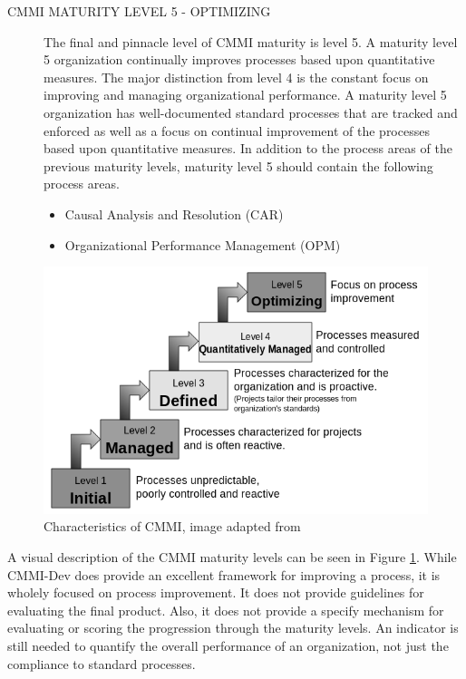 \documentclass[SDSUThesis.tex]{subfiles}
\begin{document}
\begin{description}
        \item[CMMI MATURITY LEVEL 5 - OPTIMIZING]
            The final and pinnacle level of CMMI maturity is level 5.  
            A maturity level 5 organization
            continually improves processes based upon quantitative measures.  
            The major distinction from 
            level 4 is the constant focus on improving and managing 
            organizational performance.  A maturity level
            5 organization has well-documented standard processes that are 
            tracked and enforced as well as
            a focus on continual improvement of the processes based upon 
            quantitative measures.  In addition to the process areas of the 
            previous maturity levels, maturity
            level 5 should contain the following process areas.
            \begin{itemize}
                \item Causal Analysis and Resolution (CAR)
                \item Organizational Performance Management (OPM)
            \end{itemize}
    \end{description}

    \begin{figure}[ht]
        \centering
        \includegraphics[scale=.7]{images/cmmi.png}
        \caption[CHARACTERISTICS OF CMMI]{Characteristics of CMMI, 
            image adapted from  \cite{Godfrey} }
        \label{fig:cmmi}
    \end{figure}

    A visual description of the CMMI maturity levels can be seen in Figure \ref{fig:cmmi}.  
    While CMMI-Dev does provide an excellent framework for improving a process, it
    is wholely focused on process improvement.  It does not provide guidelines
    for evaluating the final product.  
    Also, it does not provide a specify mechanism for evaluating
    or scoring the progression through the maturity levels.  
    An indicator is still needed to quantify the overall 
    performance of an organization, not
    just the compliance to standard processes.  
\end{document}
